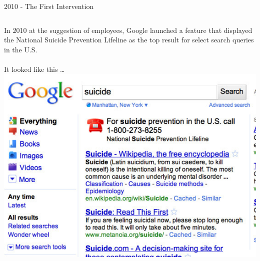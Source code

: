 \documentclass[nobackground,dvipsnames,table]{beamer}
\begin{document}
\begin{frame}{2010 - The First Intervention}
    \begin{columns}
            In 2010 at the suggestion of employees, Google launched a feature that displayed the National Suicide Prevention Lifeline as the top result for select search queries in the U.S.\\~\\
            It looked like this … 
            \includegraphics[width=\textwidth]{first-intervention}
    \end{columns}
\end{frame}
\end{document}
